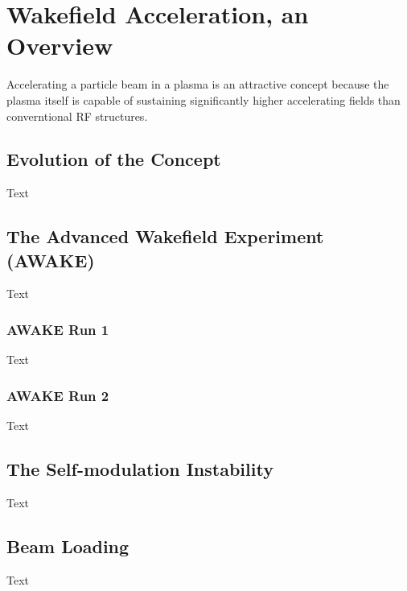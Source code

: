 %
%

\chapter{Wakefield Acceleration, an Overview}
\label{Ch:WFA}

Accelerating a particle beam in a plasma is an attractive concept because the plasma itself is
capable of sustaining significantly higher accelerating fields than converntional RF structures. 

\section{Evolution of the Concept}
\label{WFA:History}

Text

\section{The Advanced Wakefield Experiment (AWAKE)}
\label{WFA:AWAKE}

Text

\subsection{AWAKE Run 1}
\label{WFA:AWAKE:R1}

Text

\subsection{AWAKE Run 2}
\label{WFA:AWAKE:R2}

Text

\section{The Self-modulation Instability}
\label{WFA:SMI}

Text

\section{Beam Loading}
\label{WFA:BLoad}

Text

